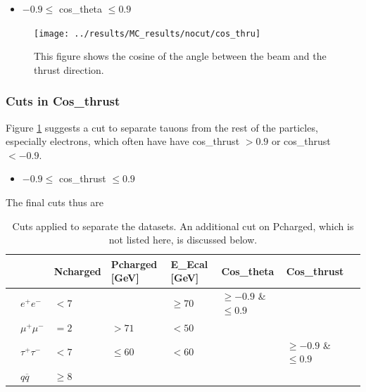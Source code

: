 \begin{itemize}
	\item{ $-0.9\le$ cos\_theta $\le0.9$}
\end{itemize}

\newpage
\begin{figure}[H]
\centering
\texttt{[image: ../results/MC\_results/nocut/cos\_thru]}
\caption[Cos\_thru in simulation data]{This figure shows the cosine of the angle between the beam and the thrust direction.}
\label{fig:cos_thru}
\end{figure}

\subsubsection{Cuts in Cos\_thrust}
Figure \ref{fig:cos_thru} suggests a cut to separate tauons from the rest of the particles, especially electrons, which often have have cos\_thrust $>0.9$ or cos\_thrust $<-0.9$.

\begin{itemize}
	\item{ $-0.9\le$ cos\_thrust $\le0.9$}
\end{itemize}

The final cuts thus are
\begin{table}[H]\centering
	\begin{tabular}{@{}llllllll@{}}
		\toprule
		&			&Ncharged	&Pcharged [GeV]	&E\_Ecal [GeV] &Cos\_theta				&Cos\_thrust\\ 
		\midrule
		&$e^+e^-$	&$<7$		&				&$\ge70$		&$\ge-0.9$ \& $\le0.9$	&\\
		&$\mu^+\mu^-$		&$=2$			&$>71$		&$<50$			&						&\\
		&$\tau^+\tau^-$		&$<7$		&$\le60$			&$<60$			&						&$\ge-0.9$ \& $\le0.9$\\
		&$q\overline{q}$		&$\ge8$		&				&				&						&	\\
		\bottomrule
	\end{tabular}
	\caption[Table of cuts]{Cuts applied to separate the datasets. An additional cut on Pcharged, which is not listed here, is discussed below.}
\end{table}
\newpage
